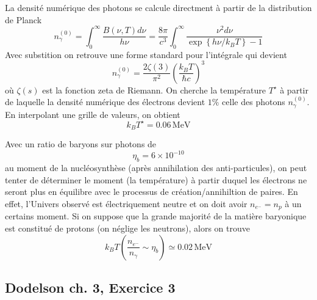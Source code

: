 \documentclass{article}
\numberwithin{equation}{section}
\begin{document}
La densité numérique des photons se calcule directment à partir de la distribution 
de Planck
\begin{equation}\label{eq:PlanckDensity} 
        n_\gamma^{(0)} = \int_0^{\infty}\frac{B(\nu, T) d\nu}{h\nu} = 
        \frac{8 \pi }{c^3}  \int_0^{\infty } 
        \frac{\nu^2 d\nu}{\exp \left\{ h\nu / k_B T \right\} - 1}
\end{equation} 
Avec substition on retrouve une forme standard pour l'intégrale qui devient
\[
        n_\gamma^{(0)} = \frac{2\zeta(3 )}{\pi^2} \left( \frac{k_B T}{\hbar c} \right)^{3}
\]
où $\zeta(s)$ est la fonction zeta de Riemann.
On cherche la température $T^\star$ à partir de laquelle la densité numérique des électrons 
devient $1\%$ celle des photons $n_\gamma^{(0)}$. En interpolant une grille de valeurs, 
on obtient
\[
        \boxed{k_BT^\star = 0.06\, \text{MeV}}
\]

Avec un ratio de baryons sur photons de
\[
        \eta_b = 6 \times 10^{-10}
\]
au moment de la nucléosynthèse (après annihilation des anti-particules), on peut 
tenter de déterminer le moment (la température) à partir duquel les électrons 
ne seront plus en équilibre avec le processus de création/annihiltion de paires. En 
effet, l'Univers observé est électriquement neutre et on doit avoir $n_{e^{-}} = n_p$ 
à un certains moment. Si on suppose que la grande majorité de la matière baryonique 
est constitué de protons (on néglige les neutrons), alors on trouve
\[
        \boxed{k_B T( \frac{n_{e^{-}}}{n_\gamma} \sim \eta_b) \simeq 0.02\, \text{MeV}}
\]

\subsection{Dodelson ch. 3, Exercice 3}
\end{document}

